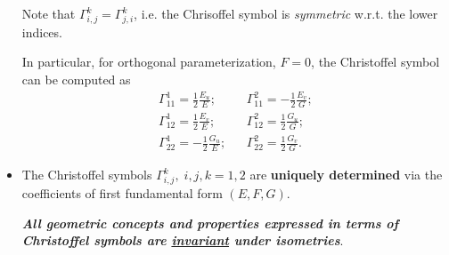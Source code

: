 \documentclass[11pt]{article}
\begin{document}
\begin{itemize}
Note that $\Gamma_{i,j}^{k} = \Gamma_{j,i}^{k}$, i.e. the Chrisoffel symbol is \emph{symmetric} w.r.t. the lower indices.

In particular, for orthogonal parameterization, $F=0$, the Christoffel symbol can be computed as
\begin{align*}
\Gamma_{11}^{1} = \frac{1}{2}\frac{E_{u}}{E};  &&
\Gamma_{11}^{2} = -\frac{1}{2}\frac{E_{v}}{G};\\
\Gamma_{12}^{1} = \frac{1}{2}\frac{E_{v}}{E};  &&
\Gamma_{12}^{2} = \frac{1}{2}\frac{G_{u}}{G};\\
\Gamma_{22}^{1} = -\frac{1}{2}\frac{G_{u}}{E};  &&
\Gamma_{22}^{2} = \frac{1}{2}\frac{G_{v}}{G}.
\end{align*}

\item The Christoffel symbols $\Gamma_{i,j}^{k},\; i,j,k=1,2$ are \textbf{uniquely determined} via the coefficients of first fundamental form $(E,F,G)$. 

\emph{\textbf{All geometric concepts and properties expressed in terms of Christoffel symbols are \underline{invariant} under isometries}}.
\end{itemize}
\end{document}
